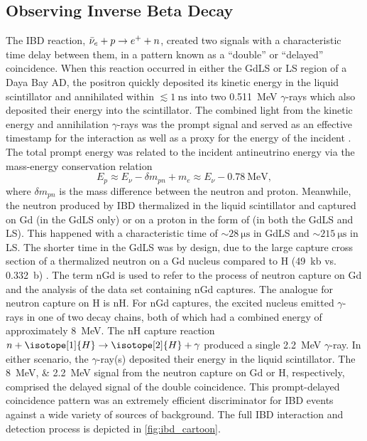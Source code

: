 \subsection{Observing Inverse Beta Decay}
\label{subsec:ibd_intro}

The IBD reaction, $\bar{\nu}_e + p \to e^+ + n$,
created two signals with a characteristic
time delay between them, in a pattern known as a ``double''
or ``delayed'' coincidence.
When this reaction occurred in either the GdLS or LS region
of a Daya Bay AD,
the positron quickly deposited its kinetic energy in the liquid scintillator
and annihilated within $\lesssim\SI{1}{\nano\second}$
into two \SI{0.511}{\MeV} $\gamma$-rays
which also deposited their energy into the scintillator.
The combined light from the kinetic energy and annihilation $\gamma$-rays
was the prompt signal
and served as an effective timestamp for the interaction
as well as a proxy for the energy of the incident \nuebar{}.
The total prompt energy was related to the incident antineutrino energy
via the mass-energy conservation relation
\begin{equation}\label{eq:prompt_vs_nu_energy}
    E_p \approx E_\nu - \delta m_{pn} + m_e \approx E_\nu - \SI{0.78}{\MeV},
\end{equation}
where $\delta m_{pn}$ is the mass difference between the neutron and proton.
Meanwhile, the neutron produced by IBD thermalized in the liquid scintillator
and captured on Gd (in the GdLS only) or on a proton in the form of 
(in both the GdLS and LS).
This happened with a characteristic time of $\sim \SI{28}{\micro\second}$
in GdLS and $\sim \SI{215}{\micro\second}$ in LS.
The shorter time in the GdLS was by design,
due to the large capture cross section of a thermalized neutron
on a Gd nucleus compared to H (\SI{49}{\kilo\barn} vs. \SI{0.332}{\barn})
\cite{gdls2014}.
The term nGd is used to refer to the process of neutron capture on Gd
and the analysis of the data set containing nGd captures.
The analogue for neutron capture on H is nH.
For nGd captures, the excited nucleus
emitted $\gamma$-rays in one of two decay chains,
both of which had a combined energy of approximately \SI{8}{\MeV}.
The nH capture reaction $n+\isotope[1]{H} \to \isotope[2]{H} + \gamma$
produced a single \SI{2.2}{\MeV} $\gamma$-ray.
In either scenario, the $\gamma$-ray(s) deposited their energy
in the liquid scintillator.
The \SIlist[list-pair-separator = { or }]{8;2.2}{\MeV} signal
from the neutron capture on Gd or H, respectively, comprised the delayed signal of the
double coincidence.
This prompt-delayed coincidence pattern was an extremely efficient
discriminator for IBD events against a wide variety of sources of background.
The full IBD interaction and detection process
is depicted in \cref{fig:ibd_cartoon}.

